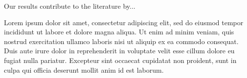 \documentclass[jou, floatsintext, colorlinks=true, linkcolor=blue, citecolor=blue, urlcolor=blue]{apa7} %
\begin{document}
Our results contribute to the literature by...

Lorem ipsum dolor sit amet, consectetur adipiscing elit, sed do eiusmod tempor incididunt ut labore et dolore magna aliqua. Ut enim ad minim veniam, quis nostrud exercitation ullamco laboris nisi ut aliquip ex ea commodo consequat. Duis aute irure dolor in reprehenderit in voluptate velit esse cillum dolore eu fugiat nulla pariatur. Excepteur sint occaecat cupidatat non proident, sunt in culpa qui officia deserunt mollit anim id est laborum.

\printbibliography %
\end{document}

